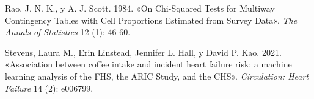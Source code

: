 \documentclass[
  spanish,
  12pt,
]{article}
\newlength{\cslhangindent}
\newenvironment{CSLReferences}[2] %
 {\begin{list}{}{%
  \setlength{\itemindent}{0pt}
  \setlength{\leftmargin}{0pt}
  \setlength{\parsep}{0pt}
  \ifodd #1
   \setlength{\leftmargin}{\cslhangindent}
   \setlength{\itemindent}{-1\cslhangindent}
  \fi
  \setlength{\itemsep}{#2\baselineskip}}}
 {\end{list}}
\begin{document}
\begin{CSLReferences}{1}{1}
Rao, J. N. K., y A. J. Scott. 1984. {«On Chi-Squared Tests for Multiway Contingency Tables with Cell Proportions Estimated from Survey Data»}. \emph{The Annals of Statistics} 12 (1): 46-60.

Stevens, Laura M., Erin Linstead, Jennifer L. Hall, y David P. Kao. 2021. {«Association between coffee intake and incident heart failure risk: a machine learning analysis of the FHS, the ARIC Study, and the CHS»}. \emph{Circulation: Heart Failure} 14 (2): e006799.

\end{CSLReferences}
\end{document}
